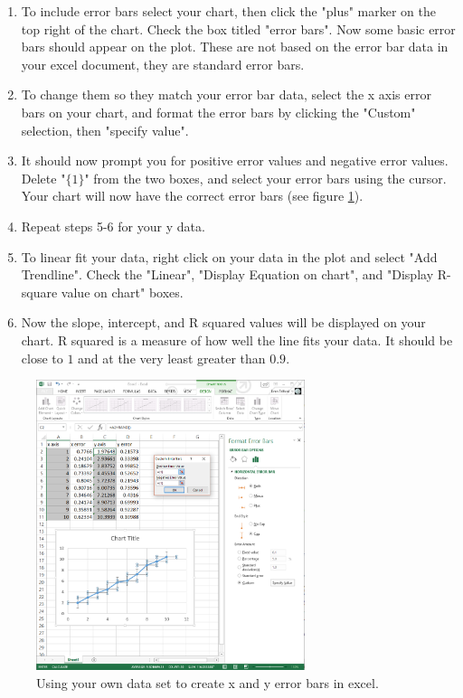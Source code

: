\begin{enumerate}
\item To include error bars select your chart, then click the "plus" marker on the top right of the chart. Check the box titled "error bars". Now some basic error bars should appear on the plot. These are not based on the error bar data in your excel document, they are standard error bars.
\item To change them so they match your error bar data, select the x axis error bars on your chart, and format the error bars by clicking the "Custom" selection, then "specify value".
\item It should now prompt you for positive error values and negative error values. Delete "$\{1\}$" from the two boxes, and select your error bars using the cursor. Your chart will now have the correct error bars (see figure \ref{fig:excel2}).

\item Repeat steps 5-6 for your y data.
\item To linear fit your data, right click on your data in the plot and select "Add Trendline". Check the "Linear", "Display Equation on chart", and "Display R-square value on chart" boxes. 
\item Now the slope, intercept, and R squared values will be displayed on your chart. R squared is a measure of how well the line fits your data. It should be close to $1$ and at the very least greater than $0.9$.
\end{enumerate}

\begin{figure}[h!]
\centering
\includegraphics[height=0.4\textheight, width=0.7\textwidth]{./Exp1/pic/image5.png}
\caption{Using your own data set to create x and y error bars in excel.}
\label{fig:excel2}
\end{figure}

